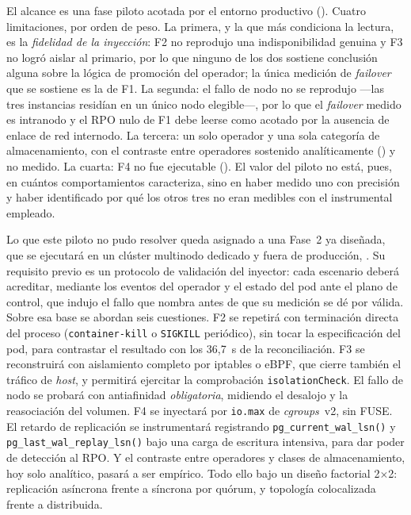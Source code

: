 El alcance es una fase piloto acotada por el entorno productivo (). Cuatro limitaciones, por orden de peso. La primera, y la que más condiciona la lectura, es la \textit{fidelidad de la inyección}: F2 no reprodujo una indisponibilidad genuina y F3 no logró aislar al primario, por lo que ninguno de los dos sostiene conclusión alguna sobre la lógica de promoción del operador; la única medición de \textit{failover} que se sostiene es la de F1. La segunda: el fallo de nodo no se reprodujo —las tres instancias residían en un único nodo elegible—, por lo que el \textit{failover} medido es intranodo y el RPO nulo de F1 debe leerse como acotado por la ausencia de enlace de red internodo. La tercera: un solo operador y una sola categoría de almacenamiento, con el contraste entre operadores sostenido analíticamente () y no medido. La cuarta: F4 no fue ejecutable (). El valor del piloto no está, pues, en cuántos comportamientos caracteriza, sino en haber medido uno con precisión y haber identificado por qué los otros tres no eran medibles con el instrumental empleado.

Lo que este piloto no pudo resolver queda asignado a una Fase~2 ya diseñada, que se ejecutará en un clúster multinodo dedicado y fuera de producción, . Su requisito previo es un protocolo de validación del inyector: cada escenario deberá acreditar, mediante los eventos del operador y el estado del pod ante el plano de control, que indujo el fallo que nombra antes de que su medición se dé por válida. Sobre esa base se abordan seis cuestiones. F2 se repetirá con terminación directa del proceso (\texttt{container-kill} o \texttt{SIGKILL} periódico), sin tocar la especificación del pod, para contrastar el resultado con los 36,7~s de la reconciliación. F3 se reconstruirá con aislamiento completo por iptables o eBPF, que cierre también el tráfico de \textit{host}, y permitirá ejercitar la comprobación \texttt{isolationCheck}. El fallo de nodo se probará con antiafinidad \emph{obligatoria}, midiendo el desalojo y la reasociación del volumen. F4 se inyectará por \texttt{io.max} de \textit{cgroups}~v2, sin FUSE. El retardo de replicación se instrumentará registrando \texttt{pg\_current\_wal\_lsn()} y \texttt{pg\_last\_wal\_replay\_lsn()} bajo una carga de escritura intensiva, para dar poder de detección al RPO. Y el contraste entre operadores y clases de almacenamiento, hoy solo analítico, pasará a ser empírico. Todo ello bajo un diseño factorial 2$\times$2: replicación asíncrona frente a síncrona por quórum, y topología colocalizada frente a distribuida.

